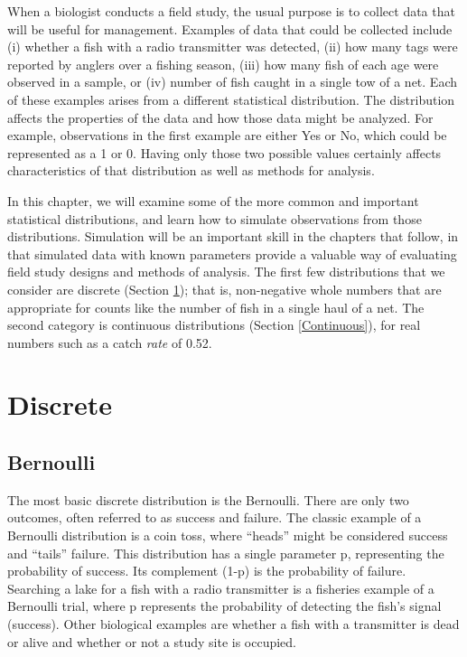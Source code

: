 \documentclass[
]{krantz}
\begin{document}
When a biologist conducts a field study, the usual purpose is to collect data that will be useful for management. Examples of data that could be collected include (i) whether a fish with a radio transmitter was detected, (ii) how many tags were reported by anglers over a fishing season, (iii) how many fish of each age were observed in a sample, or (iv) number of fish caught in a single tow of a net. Each of these examples arises from a different statistical distribution. The distribution affects the properties of the data and how those data might be analyzed. For example, observations in the first example are either Yes or No, which could be represented as a 1 or 0. Having only those two possible values certainly affects characteristics of that distribution as well as methods for analysis.

In this chapter, we will examine some of the more common and important statistical distributions, and learn how to simulate observations from those distributions. Simulation will be an important skill in the chapters that follow, in that simulated data with known parameters provide a valuable way of evaluating field study designs and methods of analysis. The first few distributions that we consider are discrete (Section \ref{Discrete}); that is, non-negative whole numbers that are appropriate for counts like the number of fish in a single haul of a net. The second category is continuous distributions (Section \ref{Continuous}), for real numbers such as a catch \emph{rate} of 0.52.

\hypertarget{Discrete}{%
\section{Discrete}\label{Discrete}}

\hypertarget{bernoulli}{%
\subsection{Bernoulli}\label{bernoulli}}

The most basic discrete distribution is the Bernoulli. There are only two outcomes, often referred to as success and failure. The classic example of a Bernoulli distribution is a coin toss, where ``heads'' might be considered success and ``tails'' failure. This distribution has a single parameter p, representing the probability of success. Its complement (1-p) is the probability of failure. Searching a lake for a fish with a radio transmitter is a fisheries example of a Bernoulli trial, where p represents the probability of detecting the fish's signal (success). Other biological examples are whether a fish with a transmitter is dead or alive and whether or not a study site is occupied.
\end{document}
